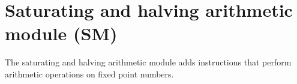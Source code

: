 %

\chapter{Saturating and halving arithmetic module (SM)}
\label{module:SM}

The saturating and halving arithmetic module adds instructions that perform
arithmetic operations on fixed point numbers.

\tbd
